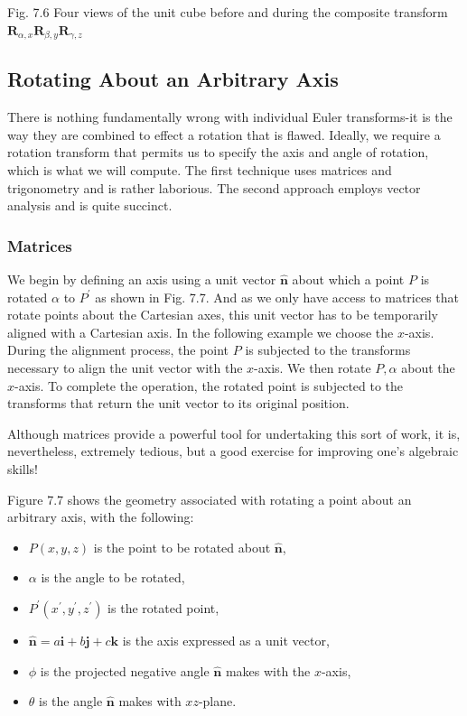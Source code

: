 \documentclass[10pt]{article}
\begin{document}
Fig. 7.6 Four views of the unit cube before and during the composite transform $\mathbf{R}_{\alpha, x} \mathbf{R}_{\beta, y} \mathbf{R}_{\gamma, z}$

\subsection{Rotating About an Arbitrary Axis}
There is nothing fundamentally wrong with individual Euler transforms-it is the way they are combined to effect a rotation that is flawed. Ideally, we require a rotation transform that permits us to specify the axis and angle of rotation, which is what we will compute. The first technique uses matrices and trigonometry and is rather laborious. The second approach employs vector analysis and is quite succinct.

\subsubsection{Matrices}
We begin by defining an axis using a unit vector $\hat{\mathbf{n}}$ about which a point $P$ is rotated $\alpha$ to $P^{\prime}$ as shown in Fig. 7.7. And as we only have access to matrices that rotate points about the Cartesian axes, this unit vector has to be temporarily aligned with a Cartesian axis. In the following example we choose the $x$-axis. During the alignment process, the point $P$ is subjected to the transforms necessary to align the unit vector with the $x$-axis. We then rotate $P, \alpha$ about the $x$-axis. To complete the operation, the rotated point is subjected to the transforms that return the unit vector to its original position.

Although matrices provide a powerful tool for undertaking this sort of work, it is, nevertheless, extremely tedious, but a good exercise for improving one's algebraic skills!

Figure 7.7 shows the geometry associated with rotating a point about an arbitrary axis, with the following:

\begin{itemize}
  \item $P(x, y, z)$ is the point to be rotated about $\hat{\mathbf{n}}$,

  \item $\alpha$ is the angle to be rotated,

  \item $P^{\prime}\left(x^{\prime}, y^{\prime}, z^{\prime}\right)$ is the rotated point,

  \item $\hat{\mathbf{n}}=a \mathbf{i}+b \mathbf{j}+c \mathbf{k}$ is the axis expressed as a unit vector,

  \item $\phi$ is the projected negative angle $\hat{\mathbf{n}}$ makes with the $x$-axis,

  \item $\theta$ is the angle $\hat{\mathbf{n}}$ makes with $x z$-plane.

\end{itemize}
\end{document}
